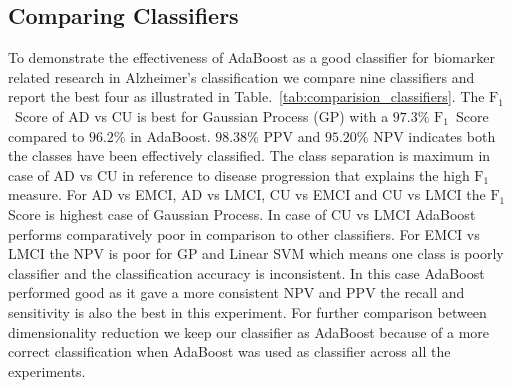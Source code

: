 \documentclass[authoryear,preprint,revi	ew,12pt]{elsarticle}
\newcommand{\Alzheimers} {{Alzheimer\textquoteright s} }
\newcommand{\F}   {$ \textrm{F}_1 $}
\begin{document}
\subsection{Comparing Classifiers}
\label{subsection:classifier_comp}
To demonstrate the effectiveness of AdaBoost as a good classifier for biomarker related research in \Alzheimers classification we compare nine classifiers and report the best four as illustrated in Table.~\ref{tab:comparision_classifiers}. The \F~Score of AD vs CU is best for Gaussian Process (GP) with a $ 97.3 \% $ \F~Score compared to $ 96.2 \% $ in AdaBoost. $ 98.38 \% $ PPV and $ 95.20 \% $ NPV indicates both the classes have been effectively classified. The class separation is maximum in case of AD vs CU in reference to disease progression that explains the high \F measure. For AD vs EMCI, AD vs LMCI, CU vs EMCI and CU vs LMCI the \F Score is highest case of Gaussian Process. In case of CU vs LMCI AdaBoost performs comparatively poor in comparison to other classifiers. For EMCI vs LMCI the NPV is poor for GP and Linear SVM which means one class is poorly classifier and the classification accuracy is inconsistent. In this case AdaBoost performed good as it gave a more consistent NPV and PPV the recall and sensitivity is also the best in this experiment. For further comparison between dimensionality reduction we keep our classifier as AdaBoost because of a more correct classification when AdaBoost was used as classifier across all the experiments.
\clearpage
\end{document}
